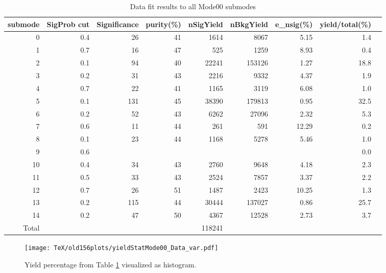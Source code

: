 \documentclass{article}
\begin{document}
\begin{table}[h]
\begin{center}
\begin{tabular}{rrrrrrrrr}
\hline
submode & SigProb cut & Significance & purity(\%) & nSigYield & nBkgYield & e\_nsig(\%) & yield/total(\%) \\ \hline
0  & 0.4 & 26  & 41 & 1614  & 8067   & 5.15  & 1.4  \\
1  & 0.7 & 16  & 47 & 525   & 1259   & 8.93  & 0.4  \\
2  & 0.1 & 94  & 40 & 22241 & 153126 & 1.27  & 18.8 \\
3  & 0.2 & 31  & 43 & 2216  & 9332   & 4.37  & 1.9  \\
4  & 0.7 & 22  & 41 & 1165  & 3119   & 6.08  & 1.0  \\
5  & 0.1 & 131 & 45 & 38390 & 179813 & 0.95  & 32.5 \\
6  & 0.2 & 52  & 43 & 6262  & 27096  & 2.32  & 5.3  \\
7  & 0.6 & 11  & 44 & 261   & 591    & 12.29 & 0.2  \\
8  & 0.1 & 23  & 44 & 1168  & 5278   & 5.46  & 1.0  \\
9  &  0.6   &     &    &       &        &       & 0.0  \\
10 & 0.4 & 34  & 43 & 2760  & 9648   & 4.18  & 2.3  \\
11 & 0.5 & 33  & 43 & 2524  & 7857   & 3.37  & 2.2  \\
12 & 0.7 & 26  & 51 & 1487  & 2423   & 10.25 & 1.3  \\
13 & 0.2 & 115 & 44 & 30444 & 137027 & 0.86  & 25.7 \\
14 & 0.2 & 47  & 50 & 4367  & 12528  & 2.73  & 3.7  \\ \hline
Total  &             &              &            & 118241    &           &            &\\ \hline
\end{tabular}
\caption{Data fit results to all Mode00 submodes}
\label{tab:DatFitMode00}
\end{center}
\end{table}
\begin{figure}[h]
\begin{center}
\texttt{[image: TeX/old156plots/yieldStatMode00\_Data\_var.pdf]}
\caption{Yield percentage from Table \ref{tab:DatFitMode00} visualized as histogram.}
\label{fig:histMode00}
\end{center}
\end{figure}
\end{document}
